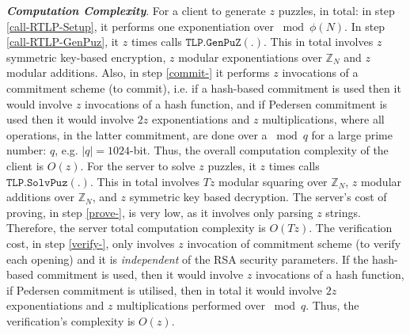  

 \noindent\textbf{\textit{Computation Complexity}}. For a client to generate $z$ puzzles, in total: in step \ref{call-RTLP-Setup}, it performs one exponentiation over $\bmod \phi(N)$. In step \ref{call-RTLP-GenPuz}, it $z$ times calls $\mathtt{TLP.GenPuZ}(.)$. This  in total involves $z$ symmetric key-based encryption,  $z$ modular exponentiations over $\mathbb{Z}_{\scriptscriptstyle N}$ and $z$ modular additions. Also, in  step \ref{commit-} it performs $z$ invocations of a commitment scheme (to commit), i.e. if a hash-based commitment is used then it would involve $z$ invocations of a hash function, and if Pedersen commitment is used then it would involve $2 z$ exponentiations and $z$ multiplications, where  all operations, in the latter commitment,  are done  over a $\bmod q$ for a large prime number: $q$, e.g. $|q|=1024$-bit. Thus, the overall computation complexity of the client   is $O(z)$. For the server to solve $z$ puzzles, it $z$ times calls $\mathtt{TLP.SolvPuz}(.)$. This in total involves $Tz$ modular squaring over $\mathbb{Z}_{\scriptscriptstyle N}$, $z$ modular additions over $\mathbb{Z}_{\scriptscriptstyle N}$, and  $z$ symmetric key based decryption. The server's cost of proving, in step \ref{prove-}, is very low, as it involves only parsing $z$ strings. Therefore, the server total computation complexity is $O(Tz)$. The verification cost, in step \ref{verify-}, only involves $z$ invocation of commitment scheme (to verify  each opening) and it is \emph{independent} of the RSA security parameters.  If the hash-based commitment is used, then it would involve $z$ invocations of a hash function,  if Pedersen commitment is utilised, then in total it would involve $2 z$ exponentiations and $z$ multiplications performed over $\bmod q$. Thus, the  verification's complexity is $O(z)$.




 
 
